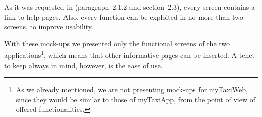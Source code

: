 As it was requested in \rasd (paragraph~2.1.2 and section~2.3), every screen contains a link to help pages. Also, every function can be exploited in no more than two screens, to improve usability.

With these mock-ups we presented only the functional screens of the two applications\footnote{As we already mentioned, we are not presenting mock-ups for myTaxiWeb, since they would be similar to those of myTaxiApp, from the point of view of offered functionalities.}, which means that other informative pages can be inserted. A tenet to keep always in mind, however, is the ease of use.


